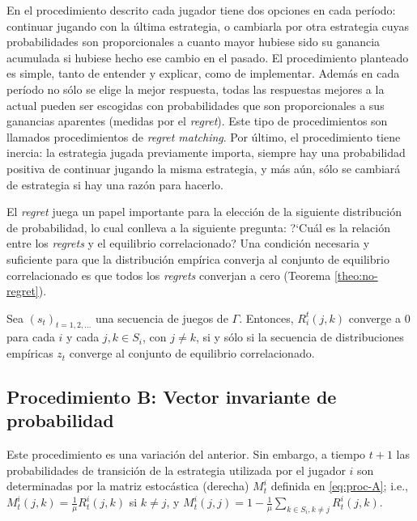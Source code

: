 
En el procedimiento descrito cada jugador tiene dos opciones en cada período: continuar jugando con la última estrategia, o cambiarla por otra estrategia cuyas probabilidades son proporcionales a cuanto mayor hubiese sido su ganancia acumulada si hubiese hecho ese cambio en el pasado. El procedimiento planteado es simple, tanto de entender y explicar, como de implementar. Además en cada período no sólo se elige la mejor respuesta, todas las respuestas mejores a la actual pueden ser escogidas con probabilidades que son proporcionales a sus ganancias aparentes (medidas por el \textit{regret}). Este tipo de procedimientos son llamados procedimientos de \textit{regret matching}. Por último, el procedimiento tiene inercia: la estrategia jugada previamente importa, siempre hay una probabilidad positiva de continuar jugando la misma estrategia, y más aún, sólo se cambiará de estrategia si hay una razón para hacerlo.

El \textit{regret} juega un papel importante para la elección de la siguiente distribución de probabilidad, lo cual conlleva a la siguiente pregunta: ?`Cuál es la relación entre los \textit{regrets} y el equilibrio correlacionado? Una condición necesaria y suficiente para que la distribución empírica converja al conjunto de equilibrio correlacionado es que todos los \textit{regrets} converjan a cero (Teorema \ref{theo:no-regret}).

\begin{theorem}
\label{theo:no-regret}
Sea $(s_t)_{t = 1, 2, ...}$ una secuencia de juegos de $\Gamma$.
Entonces, $R_i^t(j, k)$ converge a $0$ para cada $i$ y cada $j, k \in S_i$, con $j \neq k$, si y sólo si la secuencia de distribuciones empíricas $z_t$ converge al conjunto de equilibrio correlacionado.
\end{theorem}

\subsection*{Procedimiento B: Vector invariante de probabilidad}

Este procedimiento es una variación del anterior. Sin embargo, a tiempo $t+1$ las probabilidades de transición de la estrategia utilizada por el jugador $i$ son determinadas por la matriz estocástica (derecha) $M^i_t$ definida en \eqref{eq:proc-A}; i.e., $M^i_t(j,k)=\frac{1}{\mu}R^i_t(j,k)$ si $k\neq j$, y $M^i_t(j,j)=1-\frac{1}{\mu}\sum_{k\in S_i,k\neq j} R^i_t(j,k)$.


